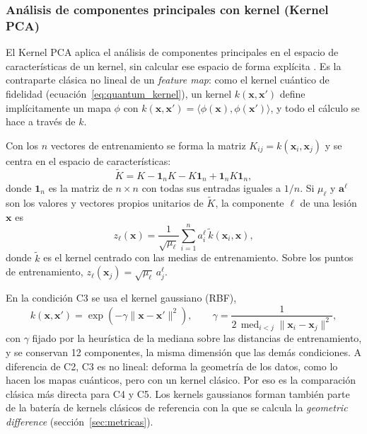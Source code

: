 
\subsubsection{Análisis de componentes principales con kernel (Kernel PCA)}
\label{sec:kernel_pca}

El Kernel PCA aplica el análisis de componentes principales en el espacio de características de un kernel, sin calcular ese espacio de forma explícita \cite{Scholkopf1998KPCA}. Es la contraparte clásica no lineal de un \textit{feature map}: como el kernel cuántico de fidelidad (ecuación~\eqref{eq:quantum_kernel}), un kernel $k(\mathbf{x},\mathbf{x}')$ define implícitamente un mapa $\phi$ con $k(\mathbf{x},\mathbf{x}') = \langle \phi(\mathbf{x}), \phi(\mathbf{x}') \rangle$, y todo el cálculo se hace a través de $k$.

Con los $n$ vectores de entrenamiento se forma la matriz $K_{ij} = k(\mathbf{x}_i, \mathbf{x}_j)$ y se centra en el espacio de características:
\begin{equation}
  \tilde{K} = K - \mathbf{1}_n K - K \mathbf{1}_n + \mathbf{1}_n K \mathbf{1}_n,
  \label{eq:kpca_centrado}
\end{equation}
donde $\mathbf{1}_n$ es la matriz de $n \times n$ con todas sus entradas iguales a $1/n$. Si $\mu_\ell$ y $\mathbf{a}^{\ell}$ son los valores y vectores propios unitarios de $\tilde{K}$, la componente $\ell$ de una lesión $\mathbf{x}$ es
\begin{equation}
  z_\ell(\mathbf{x}) = \frac{1}{\sqrt{\mu_\ell}} \sum_{i=1}^{n} a^{\ell}_i\, \tilde{k}(\mathbf{x}_i, \mathbf{x}),
  \label{eq:kpca_proyeccion}
\end{equation}
donde $\tilde{k}$ es el kernel centrado con las medias de entrenamiento. Sobre los puntos de entrenamiento, $z_\ell(\mathbf{x}_j) = \sqrt{\mu_\ell}\, a^{\ell}_j$.

En la condición C3 se usa el kernel gaussiano (RBF),
\begin{equation}
  k(\mathbf{x}, \mathbf{x}') = \exp\!\left(-\gamma \lVert \mathbf{x} - \mathbf{x}' \rVert^2\right),
  \qquad
  \gamma = \frac{1}{2\,\operatorname{med}_{i<j}\lVert \mathbf{x}_i - \mathbf{x}_j \rVert^2},
  \label{eq:rbf_mediana}
\end{equation}
con $\gamma$ fijado por la heurística de la mediana sobre las distancias de entrenamiento, y se conservan 12 componentes, la misma dimensión que las demás condiciones. A diferencia de C2, C3 es no lineal: deforma la geometría de los datos, como lo hacen los mapas cuánticos, pero con un kernel clásico. Por eso es la comparación clásica más directa para C4 y C5. Los kernels gaussianos forman también parte de la batería de kernels clásicos de referencia con la que se calcula la \textit{geometric difference} (sección~\ref{sec:metricas}).
